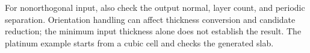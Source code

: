 For nonorthogonal input, also check the output normal, layer count, and periodic separation. Orientation handling can affect thickness conversion and candidate reduction; the minimum input thickness alone does not establish the result. The platinum example starts from a cubic cell and checks the generated slab.
